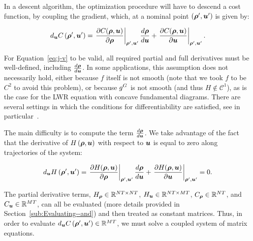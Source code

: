 In a descent algorithm, the optimization procedure will have to descend
a cost function, by coupling the gradient, which, at a nominal point
$\left(\nominal{\state},\nominal{\control}\right)$ is given by:

\begin{equation}
d_{\control}\cost\left(\nominal{\state},\nominal{\control}\right)=\evaluate{\pfrac{\cost\text{\ensuremath{\left(\state,\control\right)}}}{\state}}{\nominal{\state},\nominal{\control}}\Dfrac{\state}{\control}+\evaluate{\pfrac{\cost\text{\ensuremath{\left(\state,\control\right)}}}{\control}}{\nominal{\state},\nominal{\control}}\label{eq:j-v}.
\end{equation}

\begin{note}
For Equation~\eqref{eq:j-v} to be valid, all required partial and full derivatives must be well-defined, including $\Dfrac{\state}{\control}$. In some applications, this assumption does not necessarily hold,
either because $f$ itself is not smooth (note that we took $f$ to
be $C^{2}$ to avoid this problem), or because $g^{G}$ is not
smooth (and thus $H \notin \mathcal{C}^1$), as is the case for the LWR equation with concave fundamental diagrams. There are several settings in which the
conditions for differentiability are satisfied, see in particular~\cite{Gugat2005,Flasskamp2012}.
\end{note}

The main difficulty is to compute the term $\Dfrac{\state}{\control}$.
We take advantage of the fact that the derivative of $H\left(\state,\control\right)$
with respect to $\control$ is equal to zero along trajectories of
the system:

\begin{equation}
d_{\control}\sys\left(\nominal{\state},\nominal{\control}\right)=\evaluate{\pfrac{\sys\text{\ensuremath{\left(\state,\control\right)}}}{\state}}{\nominal{\state},\nominal{\control}}\Dfrac{\state}{\control}+\evaluate{\pfrac{\sys\text{\ensuremath{\left(\state,\control\right)}}}{\control}}{\nominal{\state},\nominal{\control}}=0\label{eq:h-v}.
\end{equation}


The partial derivative terms, $\Hx\in\mathbb{R}^{\nlinks\ntime\times\nlinks\ntime}$,
$\Hu\in\mathbb{R}^{\nlinks\ntime\times\ncontrols\ntime}$, $\Jx\in\mathbb{R}^{\nlinks\ntime}$,
and $\Ju\in\mathbb{R}^{\ncontrols\ntime}$, can all be evaluated (more
details provided in Section~\ref{sub:Evaluating--and}) and then
treated as constant matrices. Thus, in order to evaluate $d_{\control}\cost\left(\nominal{\state},\nominal{\control}\right)\in\mathbb{R}^{\ncontrols\ntime}$,
we must solve a coupled system of matrix equations.

